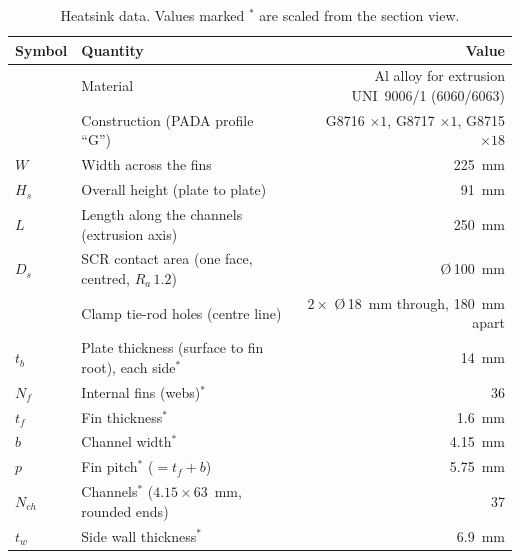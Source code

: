 \documentclass[11pt,a4paper]{article}
\begin{document}
\begin{table}[htbp]
\centering\small
\caption{Heatsink data. Values marked $^{*}$ are scaled from the section view.}
\label{tab:drawing}
\begin{tabular}{llr}
\toprule
Symbol & Quantity & Value \\
\midrule
 & Material & Al alloy for extrusion UNI~9006/1 (6060/6063) \\
 & Construction (PADA profile ``G'') & G8716 $\times1$, G8717 $\times1$, G8715 $\times18$ \\
$W$ & Width across the fins & \SI{225}{\milli\metre} \\
$H_s$ & Overall height (plate to plate) & \SI{91}{\milli\metre} \\
$L$ & Length along the channels (extrusion axis) & \SI{250}{\milli\metre} \\
$D_s$ & SCR contact area (one face, centred, $R_a\,1.2$) & \O\,\SI{100}{\milli\metre} \\
 & Clamp tie-rod holes (centre line) & $2\times$ \O\,\SI{18}{\milli\metre} through, \SI{180}{\milli\metre} apart \\
$t_b$ & Plate thickness (surface to fin root), each side$^{*}$ & \SI{14}{\milli\metre} \\
$N_f$ & Internal fins (webs)$^{*}$ & 36 \\
$t_f$ & Fin thickness$^{*}$ & \SI{1.6}{\milli\metre} \\
$b$ & Channel width$^{*}$ & \SI{4.15}{\milli\metre} \\
$p$ & Fin pitch$^{*}$ ($= t_f + b$) & \SI{5.75}{\milli\metre} \\
$N_{ch}$ & Channels$^{*}$ ($4.15\times63$~mm, rounded ends) & 37 \\
$t_w$ & Side wall thickness$^{*}$ & \SI{6.9}{\milli\metre} \\
\bottomrule
\end{tabular}
\end{table}
\end{document}
